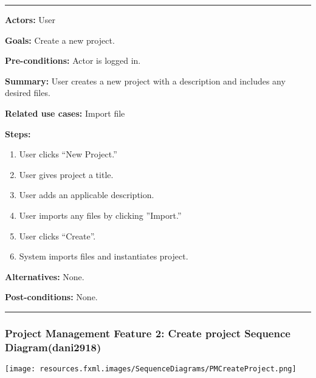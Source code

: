 \documentclass[twoside,letterpaper]{article}
\begin{document}
\vspace{2pt}
\hrule
\vspace{8pt}
 \noindent \textbf{Actors:} User \newline
 
 \noindent \textbf{Goals:} Create a new project. \newline
 
 \noindent  \textbf{Pre-conditions:} Actor is logged in.  \newline
 
 \noindent \textbf{Summary:} User creates a new project with a description and includes any desired files. \newline
 
 \noindent \textbf{Related use cases:} Import file \newline
 
 \noindent \textbf{Steps:} \begin{enumerate}
  \item User clicks ``New Project.''
  \item User gives project a title.
  \item User adds an applicable description.
  \item User imports any files by clicking ''Import.''
  \item User clicks ``Create''.
  \item System imports files and instantiates project.
 \end{enumerate}
 \textbf{Alternatives:} None. \newline
 
 \noindent  \textbf{Post-conditions:} None. \newline

\vspace{8pt}
\hrule

\vspace{20pt}

\newpage

\subsubsection[Project Management Feature 2: Create project Sequence Diagram (dani2918)]{\rmfamily\bfseries\color{black}
	Project Management Feature 2: Create project Sequence Diagram(dani2918)}

\bigskip

\texttt{[image: resources.fxml.images/SequenceDiagrams/PMCreateProject.png]}
\label{pm:sd3}
\newpage
\end{document}
